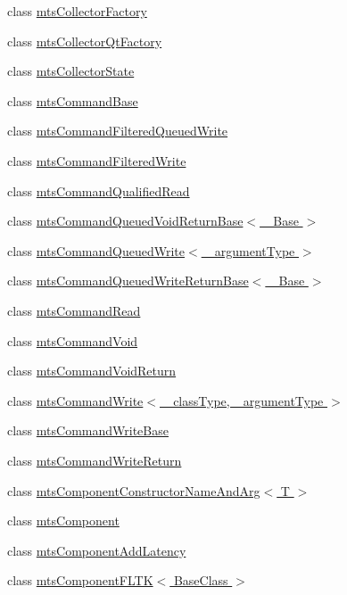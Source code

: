 \begin{DoxyCompactItemize}
\item 
class \hyperlink{classmts_collector_factory}{mts\-Collector\-Factory}
\item 
class \hyperlink{classmts_collector_qt_factory}{mts\-Collector\-Qt\-Factory}
\item 
class \hyperlink{classmts_collector_state}{mts\-Collector\-State}
\item 
class \hyperlink{classmts_command_base}{mts\-Command\-Base}
\item 
class \hyperlink{classmts_command_filtered_queued_write}{mts\-Command\-Filtered\-Queued\-Write}
\item 
class \hyperlink{classmts_command_filtered_write}{mts\-Command\-Filtered\-Write}
\item 
class \hyperlink{classmts_command_qualified_read}{mts\-Command\-Qualified\-Read}
\item 
class \hyperlink{classmts_command_queued_void_return_base}{mts\-Command\-Queued\-Void\-Return\-Base$<$ \-\_\-\-Base $>$}
\item 
class \hyperlink{classmts_command_queued_write}{mts\-Command\-Queued\-Write$<$ \-\_\-argument\-Type $>$}
\item 
class \hyperlink{classmts_command_queued_write_return_base}{mts\-Command\-Queued\-Write\-Return\-Base$<$ \-\_\-\-Base $>$}
\item 
class \hyperlink{classmts_command_read}{mts\-Command\-Read}
\item 
class \hyperlink{classmts_command_void}{mts\-Command\-Void}
\item 
class \hyperlink{classmts_command_void_return}{mts\-Command\-Void\-Return}
\item 
class \hyperlink{classmts_command_write}{mts\-Command\-Write$<$ \-\_\-class\-Type, \-\_\-argument\-Type $>$}
\item 
class \hyperlink{classmts_command_write_base}{mts\-Command\-Write\-Base}
\item 
class \hyperlink{classmts_command_write_return}{mts\-Command\-Write\-Return}
\item 
class \hyperlink{classmts_component_constructor_name_and_arg}{mts\-Component\-Constructor\-Name\-And\-Arg$<$ T $>$}
\item 
class \hyperlink{classmts_component}{mts\-Component}
\item 
class \hyperlink{classmts_component_add_latency}{mts\-Component\-Add\-Latency}
\item 
class \hyperlink{classmts_component_f_l_t_k}{mts\-Component\-F\-L\-T\-K$<$ Base\-Class $>$}

\end{DoxyCompactItemize}
